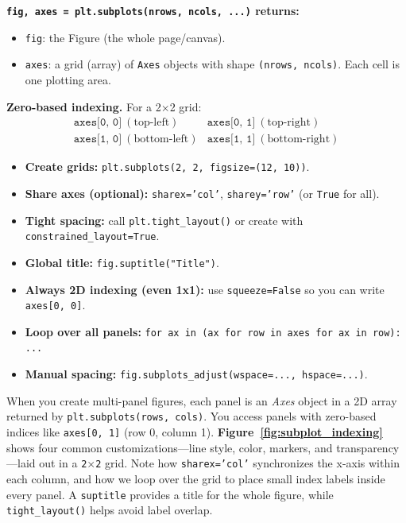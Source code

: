 
\textbf{\texttt{fig, axes = plt.subplots(nrows, ncols, ...)} returns:}
\begin{itemize}
  \item \texttt{fig}: the Figure (the whole page/canvas).
  \item \texttt{axes}: a grid (array) of \texttt{Axes} objects with shape \texttt{(nrows, ncols)}.
        Each cell is one plotting area.
\end{itemize}

\textbf{Zero-based indexing.} For a 2$\times$2 grid:
\[
\begin{array}{cc}
\texttt{axes[0, 0]}~(\text{top-left}) & \texttt{axes[0, 1]}~(\text{top-right}) \\
\texttt{axes[1, 0]}~(\text{bottom-left}) & \texttt{axes[1, 1]}~(\text{bottom-right})
\end{array}
\]

\begin{tcolorbox}[title=Subplot tips (quick reference), colframe=blue, colback=white, arc=2mm, breakable]
\begin{itemize}
  \item \textbf{Create grids:} \texttt{plt.subplots(2, 2, figsize=(12, 10))}.
  \item \textbf{Share axes (optional):} \texttt{sharex='col'}, \texttt{sharey='row'} (or \texttt{True} for all).
  \item \textbf{Tight spacing:} call \texttt{plt.tight\_layout()} or create with \texttt{constrained\_layout=True}.
  \item \textbf{Global title:} \texttt{fig.suptitle("Title")}.
  \item \textbf{Always 2D indexing (even 1x1):} use \texttt{squeeze=False} so you can write \texttt{axes[0, 0]}.
  \item \textbf{Loop over all panels:} \texttt{for ax in (ax for row in axes for ax in row): ...}
  \item \textbf{Manual spacing:} \texttt{fig.subplots\_adjust(wspace=..., hspace=...)}.
\end{itemize}
\end{tcolorbox}

When you create multi-panel figures, each panel is an \emph{Axes} object in a 2D array returned by \texttt{plt.subplots(rows, cols)}. You access panels with zero-based indices like \texttt{axes[0, 1]} (row 0, column 1). \textbf{Figure~\ref{fig:subplot_indexing}} shows four common customizations—line style, color, markers, and transparency—laid out in a \texttt{2$\times$2} grid. Note how \texttt{sharex='col'} synchronizes the x-axis within each column, and how we loop over the grid to place small index labels inside every panel. A \texttt{suptitle} provides a title for the whole figure, while \texttt{tight\_layout()} helps avoid label overlap.


